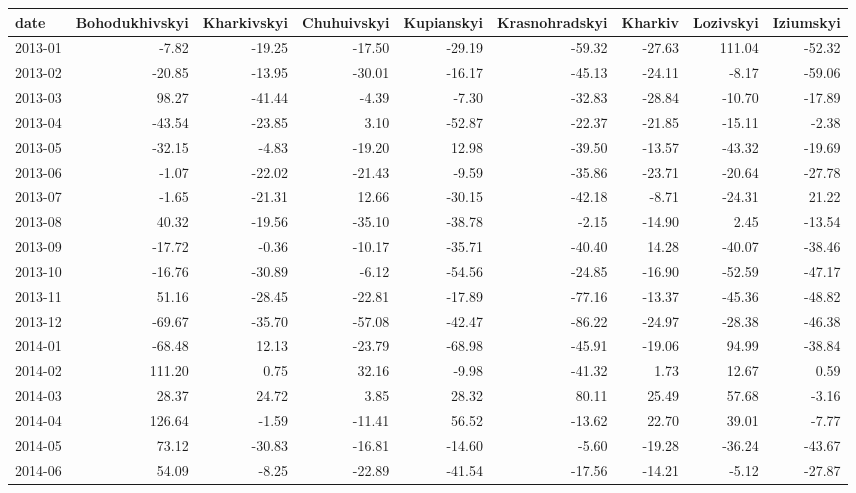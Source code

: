 \begin{table}[ht]
\centering
\begin{tabular}{lrrrrrrrr}
  \hline
date & Bohodukhivskyi & Kharkivskyi & Chuhuivskyi & Kupianskyi & Krasnohradskyi & Kharkiv & Lozivskyi & Iziumskyi \\ 
  \hline
2013-01 & -7.82 & -19.25 & -17.50 & -29.19 & -59.32 & -27.63 & 111.04 & -52.32 \\ 
  2013-02 & -20.85 & -13.95 & -30.01 & -16.17 & -45.13 & -24.11 & -8.17 & -59.06 \\ 
  2013-03 & 98.27 & -41.44 & -4.39 & -7.30 & -32.83 & -28.84 & -10.70 & -17.89 \\ 
  2013-04 & -43.54 & -23.85 & 3.10 & -52.87 & -22.37 & -21.85 & -15.11 & -2.38 \\ 
  2013-05 & -32.15 & -4.83 & -19.20 & 12.98 & -39.50 & -13.57 & -43.32 & -19.69 \\ 
  2013-06 & -1.07 & -22.02 & -21.43 & -9.59 & -35.86 & -23.71 & -20.64 & -27.78 \\ 
  2013-07 & -1.65 & -21.31 & 12.66 & -30.15 & -42.18 & -8.71 & -24.31 & 21.22 \\ 
  2013-08 & 40.32 & -19.56 & -35.10 & -38.78 & -2.15 & -14.90 & 2.45 & -13.54 \\ 
  2013-09 & -17.72 & -0.36 & -10.17 & -35.71 & -40.40 & 14.28 & -40.07 & -38.46 \\ 
  2013-10 & -16.76 & -30.89 & -6.12 & -54.56 & -24.85 & -16.90 & -52.59 & -47.17 \\ 
  2013-11 & 51.16 & -28.45 & -22.81 & -17.89 & -77.16 & -13.37 & -45.36 & -48.82 \\ 
  2013-12 & -69.67 & -35.70 & -57.08 & -42.47 & -86.22 & -24.97 & -28.38 & -46.38 \\ 
  2014-01 & -68.48 & 12.13 & -23.79 & -68.98 & -45.91 & -19.06 & 94.99 & -38.84 \\ 
  2014-02 & 111.20 & 0.75 & 32.16 & -9.98 & -41.32 & 1.73 & 12.67 & 0.59 \\ 
  2014-03 & 28.37 & 24.72 & 3.85 & 28.32 & 80.11 & 25.49 & 57.68 & -3.16 \\ 
  2014-04 & 126.64 & -1.59 & -11.41 & 56.52 & -13.62 & 22.70 & 39.01 & -7.77 \\ 
  2014-05 & 73.12 & -30.83 & -16.81 & -14.60 & -5.60 & -19.28 & -36.24 & -43.67 \\ 
  2014-06 & 54.09 & -8.25 & -22.89 & -41.54 & -17.56 & -14.21 & -5.12 & -27.87 \\ 

\end{tabular}
\end{table}
